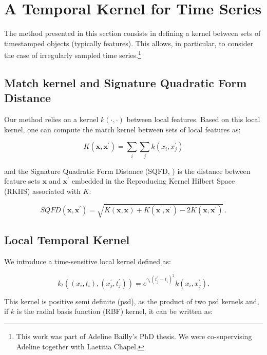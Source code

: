 \section{A Temporal Kernel for Time Series}
\label{sec:kernel}

The method presented in this section consists in defining a kernel between
sets of timestamped objects (typically features).
This allows, in particular, to consider the case of irregularly sampled time
series.\footnote{This work was part of Adeline Bailly's PhD thesis.
We were co-supervising Adeline together with Laetitia Chapel.}

\subsection{Match kernel and Signature Quadratic Form Distance}

Our method relies on a kernel $k(\cdot,\cdot)$ between local
features.
Based on this local kernel, one can compute the match kernel
\cite{NIPS2009_3874} between sets of local features as:

\begin{equation}
    K(\mathbf{x}, \mathbf{x}^\prime) = \sum_i \sum_j k(x_i, x^\prime_j)
\end{equation}

\noindent
and the Signature Quadratic Form Distance (SQFD,
\cite{10.1145/1631272.1631391}) is the distance
between feature sets $\mathbf{x}$ and $\mathbf{x}^\prime$ embedded in the
Reproducing Kernel Hilbert Space (RKHS)
associated with $K$:

\begin{equation}
    SQFD(\mathbf{x}, \mathbf{x}^\prime) =
        \sqrt{K(\mathbf{x}, \mathbf{x})
              + K(\mathbf{x}^\prime, \mathbf{x}^\prime)
              - 2 K(\mathbf{x}, \mathbf{x}^\prime)}
        \, .
\end{equation}

\subsection{Local Temporal Kernel}

We introduce a time-sensitive local kernel defined as:

\begin{equation}
    k_t((x_i, t_i), (x^\prime_j, t^\prime_j)) = e^{\gamma_t (t^\prime_j - t_i)^2} k(x_i, x^\prime_j).
\end{equation}

This kernel is positive semi definite (psd), as the product of two psd kernels
and, if $k$ is the radial basis function (RBF) kernel, it can be written as:

